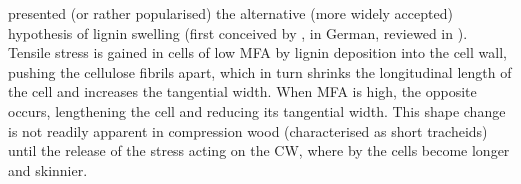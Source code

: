 \citet{Boyd_1972} presented (or rather popularised) the alternative (more widely
accepted) hypothesis of lignin swelling (first conceived by \citet{munch1938}, in German, reviewed in \citet{Boyd_1972}). Tensile
stress is gained in cells of low MFA by lignin deposition into the cell wall,
pushing the cellulose fibrils apart, which in turn shrinks the longitudinal
length of the cell and increases the tangential width. When MFA is high, the
opposite occurs, lengthening the cell and reducing its tangential width. This
shape change is not readily apparent in compression wood (characterised as short
tracheids) until the release of the stress acting on the CW, where by the cells
become longer and skinnier.
